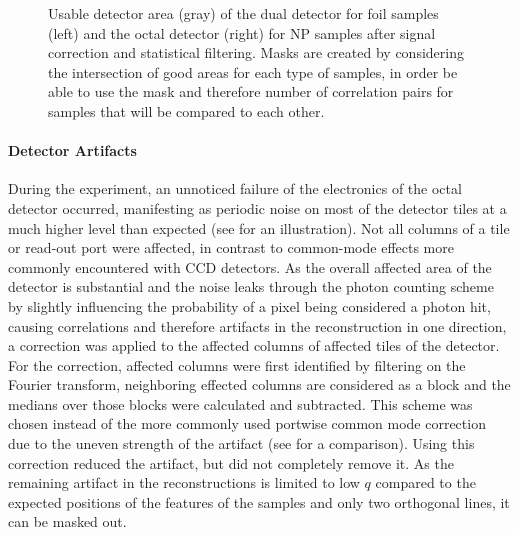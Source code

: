 \begin{figure}
\begin{subfigure}{0.2\textwidth}
	\end{subfigure}
	\caption[Usable detector area]{Usable detector area (gray) of the dual detector for foil samples (left) and the octal detector (right) for NP samples after signal correction and statistical filtering. Masks are created by considering the intersection of good areas for each type of samples, in order be able to use the mask and therefore number of correlation pairs for samples that will be compared to each other.}	
	\label{fig:mask}
\end{figure}

\paragraph{Detector Artifacts}
During the experiment, an unnoticed failure of the electronics of the octal detector occurred, manifesting as periodic noise on most of the detector tiles at a much higher level than expected (see  for an illustration). Not all columns of a tile or read-out port were affected, in contrast to common-mode effects more commonly encountered with CCD detectors. As the overall affected area of the detector is substantial and the noise leaks through the photon counting scheme by slightly influencing the probability of a pixel being considered a photon hit, causing correlations and therefore artifacts in the reconstruction in one direction, a correction was applied to the affected columns of affected tiles of the detector. For the correction, affected columns were first identified by filtering on the Fourier transform, neighboring effected columns are considered as a block and the medians over those blocks were calculated and subtracted. This scheme was chosen instead of the more commonly used portwise common mode correction due to the uneven strength of the artifact (see  for a comparison). Using this correction reduced the artifact, but did not completely remove it. As the remaining artifact in the reconstructions is limited to low $q$ compared to the expected positions of the features of the samples and only two orthogonal lines, it can be masked out.


